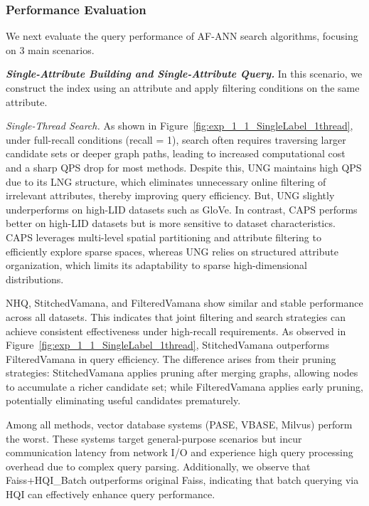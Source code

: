 \documentclass[sigconf, nonacm]{acmart}
\begin{document}
	
	
	\subsubsection{Performance Evaluation}
	
	
	
	
	We next evaluate the query performance of AF-ANN search algorithms, focusing on 3 main scenarios.
	
	\textit{\textbf{Single-Attribute Building and Single-Attribute Query.}}
	In this scenario, we construct the index using an attribute and apply filtering conditions on the same attribute.
	
	
	\textit{Single-Thread Search.}  
	As shown in Figure~\ref{fig:exp_1_1_SingleLabel_1thread}, under full-recall conditions (recall = 1), search often requires traversing larger candidate sets or deeper graph paths, leading to increased computational cost and a sharp QPS drop for most methods. Despite this, UNG maintains high QPS due to its LNG structure, which eliminates unnecessary online filtering of irrelevant attributes, thereby improving query efficiency. But, UNG slightly underperforms on high-LID datasets such as GloVe. In contrast, CAPS performs better on high-LID datasets but is more sensitive to dataset characteristics. CAPS leverages multi-level spatial partitioning and attribute filtering to efficiently explore sparse spaces, whereas UNG relies on structured attribute organization, which limits its adaptability to sparse high-dimensional distributions.
	
	NHQ, StitchedVamana, and FilteredVamana show similar and stable performance across all datasets. This indicates that joint filtering and search strategies can achieve consistent effectiveness under high-recall requirements. As observed in Figure~\ref{fig:exp_1_1_SingleLabel_1thread}, StitchedVamana outperforms FilteredVamana in query efficiency. The difference arises from their pruning strategies: StitchedVamana applies pruning after merging graphs, allowing nodes to accumulate a richer candidate set; while FilteredVamana applies early pruning, potentially eliminating useful candidates prematurely.
	
	Among all methods, vector database systems (PASE, VBASE, Milvus) perform the worst. These systems target general-purpose scenarios but incur communication latency from network I/O and experience high query processing overhead due to complex query parsing. Additionally, we observe that Faiss+HQI\_Batch outperforms original Faiss, indicating that batch querying via HQI can effectively enhance query performance.
	
\end{document}
